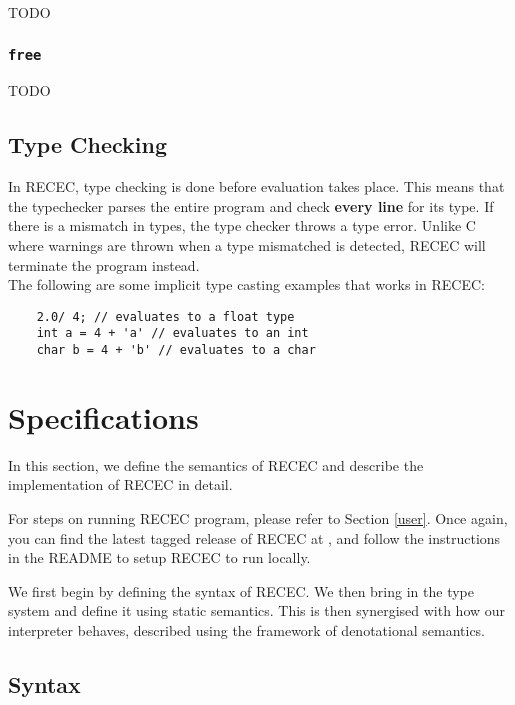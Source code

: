 \documentclass[a4paper]{article}
\begin{document}
TODO

\subsubsection{\texttt{free}}

TODO 


\subsection{Type Checking}

In RECEC, type checking is done before evaluation takes place. This means that the typechecker parses the entire program and check \textbf{every line} for its type. If there is a mismatch in types, the type checker throws a type error. Unlike C where warnings are thrown when a type mismatched is detected, RECEC will terminate the program instead. \\

The following are some implicit type casting examples that works in RECEC:

\begin{verbatim}
	2.0/ 4; // evaluates to a float type
	int a = 4 + 'a' // evaluates to an int
	char b = 4 + 'b' // evaluates to a char
\end{verbatim}

\section{Specifications}

In this section, we define the semantics of RECEC and describe the implementation of  RECEC in detail.

For steps on running RECEC program, please refer to Section \ref{user}.
Once again, you can find the latest tagged release of RECEC at \url{}, and follow the instructions in the README to setup RECEC to run locally.

We first begin by defining the syntax of RECEC.
We then bring in the type system and define it using static semantics.
This is then synergised with how our interpreter behaves, described using the framework of denotational semantics.

\subsection{Syntax}
\end{document}

